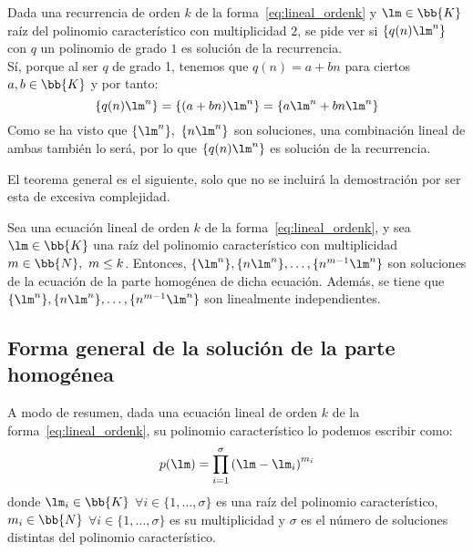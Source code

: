 \begin{ejercicio*}
    Dada una recurrencia de orden $k$ de la forma~\ref{eq:lineal_ordenk} y $\lm\in \bb{K}$ raíz del polinomio característico con multiplicidad $2$, se pide ver si $\{q(n)\lm^n\}$ con $q$ un polinomio de grado $1$ es solución de la recurrencia.\\

    Sí, porque al ser $q$ de grado 1, tenemos que $q(n)=a+bn$ para ciertos $a,b\in \bb{K}$ y por tanto:
    \begin{equation*}
        \{q(n)\lm^n\}=\{(a+bn)\lm^n\}
        = \{a\lm^n + bn\lm^n\}
    \end{equation*}
    Como se ha visto que $\{\lm^n\},~\{n\lm^n\}$ son soluciones, una combinación lineal de ambas también lo será, por lo que $\{q(n)\lm^n\}$ es solución de la recurrencia.
\end{ejercicio*}

El teorema general es el siguiente, solo que no se incluirá la demostración por ser esta de excesiva complejidad.
\begin{teo}\label{teo:soluciones_multiplicidad_multiple}
    Sea una ecuación lineal de orden $k$ de la forma~\ref{eq:lineal_ordenk}, y sea $\lm\in \bb{K}$ una raíz del polinomio característico con multiplicidad $m\in \bb{N},~m\leq k$. Entonces, $\{\lm^n\}, \{n\lm^n\}, \dots, \{n^{m-1}\lm^n\}$ son soluciones de la ecuación de la parte homogénea de dicha ecuación.
    Además, se tiene que $\{\lm^n\}, \{n\lm^n\}, \dots, \{n^{m-1}\lm^n\}$ son linealmente independientes.
\end{teo}

\subsection{Forma general de la solución de la parte homogénea}


A modo de resumen, dada una ecuación lineal de orden $k$ de la forma~\ref{eq:lineal_ordenk}, su polinomio característico lo podemos escribir como:
\begin{equation*}
    p(\lm) = \prod_{i=1}^\sigma {(\lm - \lm_i)}^{m_i}
\end{equation*}
donde $\lm_i\in \bb{K}$ $\forall i \in \{1, \ldots, \sigma\}$ es una raíz del polinomio característico, $m_i\in \bb{N}$ $\forall i \in \{1, \ldots, \sigma\}$ es su multiplicidad y $\sigma$ es el número de soluciones distintas del polinomio característico.\\

